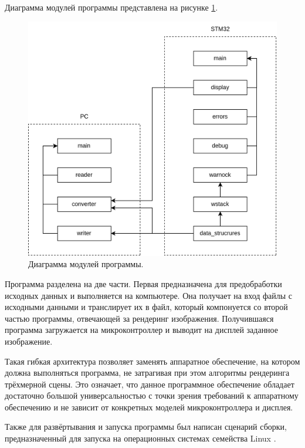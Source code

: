 Диаграмма модулей программы представлена на рисунке \ref{fig:modules}.

\begin{figure}[h]
	\centering
	\includegraphics[width=\textwidth ]{img/modules/modules.png}
	\caption{Диаграмма модулей программы.}
	\label{fig:modules}
\end{figure} 

Программа разделена на две части. Первая предназначена для предобработки исходных данных и выполняется на компьютере. Она получает на вход 
файлы с исходными данными и транслирует их в файл, который компонуется со второй частью программы, отвечающей за рендеринг изображения. 
Получившаяся программа загружается на микроконтроллер и выводит на дисплей заданное изображение.

Такая гибкая архитектура позволяет заменять аппаратное обеспечение, на котором должна выполняться программа, не затрагивая при этом 
алгоритмы рендеринга трёхмерной сцены. Это означает, что данное программное обеспечение обладает достаточно большой универсальностью
с точки зрения требований к аппаратному обеспечению и не зависит от конкретных моделей микроконтроллера и дисплея.

Также для развёртывания и запуска программы был написан сценарий сборки, предназначенный для запуска на операционных системах 
семейства Linux \cite{linux}.



